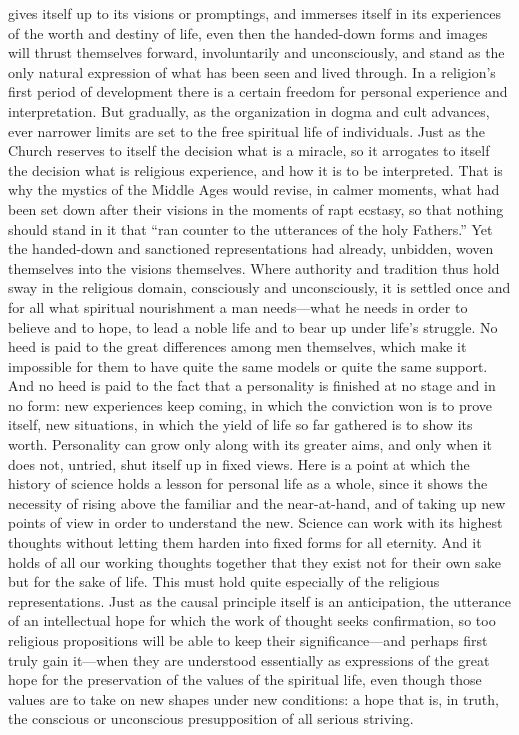 \documentclass[12pt,a4paper]{article}
\newcommand{\opage}[1]{\marginnote{\footnotesize\textit{[#1]}}}
\begin{document}
gives itself up to its visions or promptings, and immerses itself in its experiences
of the worth and destiny of life, even then the handed-down forms and images will
thrust themselves forward, involuntarily and unconsciously, and stand as the only
natural expression of what has been seen and lived through. In a religion's first
period of development there is a certain freedom for personal experience and
interpretation. But gradually, as the organization in dogma and cult advances, ever
narrower limits are set to the free spiritual life of individuals. Just as the Church
reserves to itself the decision what is a miracle, so it arrogates to itself the
decision what is religious experience, and \opage{46}how it is to be interpreted.
That is why the mystics of the Middle Ages would revise, in calmer moments, what had
been set down after their visions in the moments of rapt ecstasy, so that nothing
should stand in it that ``ran counter to the utterances of the holy Fathers.'' Yet
the handed-down and sanctioned representations had already, unbidden, woven
themselves into the visions themselves. Where authority and tradition thus hold sway
in the religious domain, consciously and unconsciously, it is settled once and for
all what spiritual nourishment a man needs---what he needs in order to believe and to
hope, to lead a noble life and to bear up under life's struggle. No heed is paid to
the great differences among men themselves, which make it impossible for them to have
quite the same models or quite the same support. And no heed is paid to the fact that
a personality is finished at no stage and in no form: new experiences keep coming, in
which the conviction won is to prove itself, new situations, in which the yield of
life so far gathered is to show its worth. Personality can grow only along with its
greater aims, and only when it does not, untried, shut itself up in fixed views. Here
is a point at which the history of science holds a lesson for personal life as a
whole, since it shows the necessity of rising above the familiar and the
near-at-hand, and of taking up new points of view in order to understand the new.
Science can work with its highest thoughts without letting them harden into fixed
forms for all eternity. And it holds of all our working thoughts together that they
exist not for their own sake but for the sake of life. This must hold quite especially
of the religious representations. Just as the causal principle itself is an
anticipation, the utterance of an intellectual hope for which the work of thought
seeks confirmation, so too religious propositions will be able to keep their
significance---and perhaps first truly gain it---when they are \opage{47}understood essentially
as expressions of the great hope for the preservation of the values of the spiritual
life, even though those values are to take on new shapes under new conditions: a hope
that is, in truth, the conscious or unconscious presupposition of all serious
striving.
\end{document}
